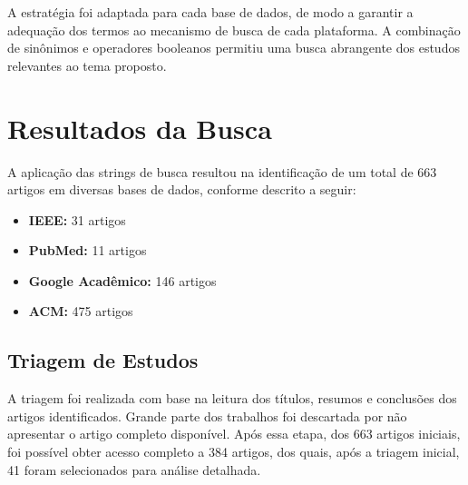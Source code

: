 \documentclass[a4paper,12pt]{article}
\begin{document}
A estratégia foi adaptada para cada base de dados, de modo a garantir a adequação dos termos ao mecanismo de busca de cada plataforma. A combinação de sinônimos e operadores booleanos permitiu uma busca abrangente dos estudos relevantes ao tema proposto.

\section{Resultados da Busca}
A aplicação das strings de busca resultou na identificação de um total de 663 artigos em diversas bases de dados, conforme descrito a seguir:

\begin{itemize}
    \item \textbf{IEEE:} 31 artigos
    \item \textbf{PubMed:} 11 artigos
    \item \textbf{Google Acadêmico:} 146 artigos
    \item \textbf{ACM:} 475 artigos
\end{itemize}



\subsection{Triagem de Estudos}
A triagem foi realizada com base na leitura dos títulos, resumos e conclusões dos artigos identificados. Grande parte dos trabalhos foi descartada por não apresentar o artigo completo disponível. Após essa etapa, dos 663 artigos iniciais, foi possível obter acesso completo a 384 artigos, dos quais, após a triagem inicial, 41 foram selecionados para análise detalhada.
\end{document}
